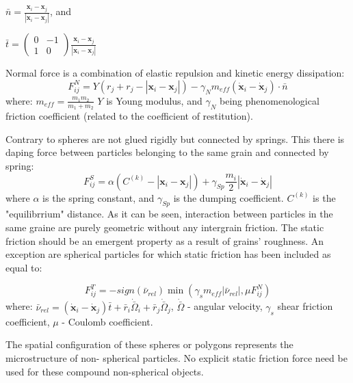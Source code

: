 \documentclass[10pt,a4paper]{article}
\begin{document}
$\bar{n} = \frac{\mathbf{x}_{i} - \mathbf{x}_j}{|\mathbf{x}_{i} - \mathbf{x}_j|} $, and

$\bar{t} = \begin{pmatrix} 0 & -1 \\ 1 & 0 \end{pmatrix} \frac{\mathbf{x}_{i} - \mathbf{x}_j}{|\mathbf{x}_{i} - \mathbf{x}_j|} $

Normal force is a combination of elastic repulsion and kinetic energy dissipation:
\begin{equation}
 F^{N}_{ij} = Y(r_j + r_j - |\mathbf{x}_{i} - \mathbf{x}_j| ) - \gamma_N m_{eff} (\dot{\mathbf{x}}_{i} - \dot{\mathbf{x}}_j)\cdot \bar{n}
\end{equation}
where: $m_{eff} = \frac{m_1 m_2}{m_1 + m_2}$
$Y$ is Young modulus, and $\gamma_N$ being phenomenological friction coefficient (related to the coefficient of restitution).

Contrary to \cite{sok93} spheres are not glued rigidly but connected by springs.
This there is daping force between particles belonging to the same grain and connected by spring:
\begin{equation}
 F^{S}_{ij} =\alpha \left(C^{(k)} -  |\mathbf{x}_{i} - \mathbf{x}_j| \right) + \gamma_{Sp} \frac{m_i}{2} |\dot{\mathbf{x}}_{i} - \dot{\mathbf{x}}_j|
\end{equation}
where $\alpha$ is the spring constant, and $\gamma_{Sp}$ is the dumping coefficient. $C^{(k)}$ is the "equilibrrium" distance.
As it can be seen, interaction between particles in the same  graine are purely geometric without any intergrain friction.
The static friction should be an emergent property as a result of grains' roughness. 
An exception are spherical particles for which static friction has been included as equal to\cite{cs79, herr93, herr94}:
 
\begin{equation}
F^{T}_{ij} = -sign(\bar{\nu}_{rel}) \min(\gamma_{s} m_{eff} |\bar{\nu}_{rel}| , \mu F^{N}_{ij} )
\end{equation}
where:
$\bar{\nu}_{rel} = (\dot{\mathbf{x}}_{i} - \dot{\mathbf{x}}_j)\bar{t} + \bar{r}_i \dot{\bar{\Omega}}_i + \bar{r}_j \dot{\bar{\Omega}}_j$,
$\dot{\bar{\Omega}}$ - angular velocity, $\gamma_s$ shear friction coefficient, $\mu$ - Coulomb coefficient.


The spatial configuration of these
spheres or polygons represents the microstructure of non-
spherical particles. No explicit static friction force need be
used for these compound non-spherical objects.
\end{document}
